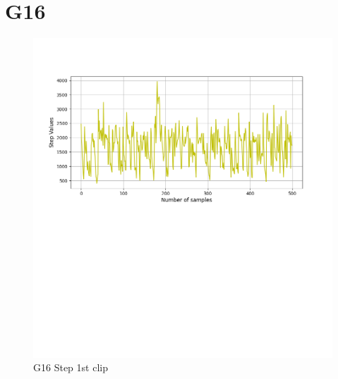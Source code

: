 \documentclass[hidelinks, 12pt, a4paper]{article}
\begin{document}
\section{G16}

\begin{figure}[h!]
\centering
	\includegraphics[height=.38\textheight, width=\textwidth]{assets/session2/g16.png}
    \caption{G16 Step 1st clip  }
\end{figure}
\end{document}
